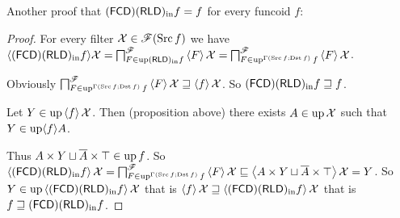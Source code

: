 Another proof that $\tofcd\torldin f=f$ for every funcoid $f$:
\begin{proof}
For every filter $\mathcal{X}\in\mathscr{F}(\Src f)$ we have $\langle\tofcd\torldin f\rangle\mathcal{X}=\bigsqcap_{F\in\up\torldin f}^{\mathscr{F}}\supfun F\mathcal{X}=\bigsqcap_{F\in\up^{\Gamma(\Src f;\Dst f)}f}^{\mathscr{F}}\supfun F\mathcal{X}$.

Obviously $\bigsqcap_{F\in\up^{\Gamma(\Src f;\Dst f)}f}^{\mathscr{F}}\supfun F\mathcal{X}\sqsupseteq\supfun f\mathcal{X}$.
So $\tofcd\torldin f\sqsupseteq f$.

Let $Y\in\up\supfun f\mathcal{X}$. Then (proposition above) there
exists $A\in\up\mathcal{X}$ such that $Y\in\up\langle f\rangle A$.

Thus $A\times Y\sqcup\overline{A}\times\top\in\up f$. So $\supfun{\tofcd\torldin f}\mathcal{X}=\bigsqcap_{F\in\up^{\Gamma(\Src f;\Dst f)}f}^{\mathscr{F}}\supfun F\mathcal{X}\sqsubseteq\supfun{A\times Y\sqcup\overline{A}\times\top}\mathcal{X}=Y$.
So $Y\in\up\supfun{\tofcd\torldin f}\mathcal{X}$ that
is $\supfun f\mathcal{X}\sqsupseteq\supfun{\tofcd\torldin f}\mathcal{X}$
that is $f\sqsupseteq\tofcd\torldin f$.\end{proof}

